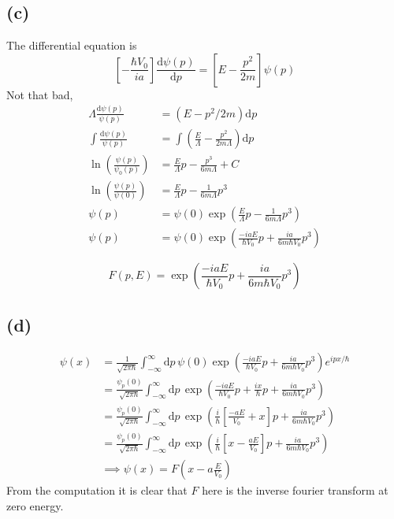 \documentclass[letterpaper]{article}
\newcommand{\hb}{\hbar}
\begin{document}
\subsection*{(c)} 
The differential equation is 
\[
\left[
- \frac{\hb V_0}{i a}
\right] \frac{\mathrm{d} \psi(p)}{\mathrm{d} p}  = 
\left[
E - \frac{p^2}{2m} \right] \psi(p)
\]
Not that bad, 
\begin{align*}
	\Lambda \frac{\mathrm{d} \psi(p)}{\psi(p)} &= (E - p^2 / 2m ) \mathrm{d} p \\
\int	\frac{\mathrm{d} \psi(p)}{\psi ( p) } &= 
\int	\left(\frac{E}{\Lambda} - \frac{p^2}{2m \Lambda}\right) \mathrm{d} p\\
\ln \left(\frac{\psi(p)}{\psi_0(p)}\right) &= \frac{E}{\Lambda} p - \frac{p^3}{6 m \Lambda} + C \\
\ln\left(\frac{\psi(p)}{\psi(0)}\right) &= 
\frac{E}{\Lambda}p - \frac{1}{6 m \Lambda} p^3
\\ 
\psi(p) &= \psi(0) \exp \left({
\frac{E}{\Lambda}p - \frac{1}{6 m \Lambda} p^3} \right) \\ 
\psi(p) &= \psi(0) \exp \left({
\frac{- i a E }{\hb V_0}p + \frac{i a }{6 m \hb V_0} p^3} \right)
\end{align*}

\[ \boxed{
F(p, E) =  \exp \left(
\frac{- i a E }{\hb V_0}p + \frac{i a }{6 m \hb V_0} p^3 \right)
}\] 


\subsection*{(d)} 
\begin{align*}
	\psi(x) &= \frac{1}{ \sqrt{ 2 \pi \hb}} 
	\int_{-\infty}^{\infty} \mathrm{d} p \, \psi(0)  
	\exp \left( 
\frac{- i a E }{\hb V_0}p + \frac{i a }{6 m \hb V_0} p^3 \right) e^{i p x / \hb } \\ 
&= 
\frac{\psi_p(0)}{\sqrt{2 \pi \hb } } 
\int_{-\infty}^{\infty} 
\mathrm{d} p \, 
\exp 
\left(
\frac{- i a E }{\hb V_0}p + \frac{i x}{\hb } p + \frac{i a }{6 m \hb V_0} p^3 
\right)
\\
&= 
\frac{\psi_p(0)}{\sqrt{2 \pi \hb } } 
\int_{-\infty}^{\infty} 
\mathrm{d} p \, 
\exp 
\left( \frac{i}{\hb} 
	\left [\frac{- a E }{ V_0} + { x}{ } \right ] p + \frac{i a }{6 m \hb V_0} p^3 
\right)
\\ & = 
\frac{\psi_p(0)}{\sqrt{2 \pi \hb } } 
\int_{-\infty}^{\infty} 
\mathrm{d} p \, 
\exp 
\left( \frac{i}{\hb} 
	\left [ x - \frac{ a E }{ V_0} \right ] p + \frac{i a }{6 m \hb V_0} p^3 
\right)
 \\&
\implies
\psi(x) = F \left(x - a \frac{E}{V_0}\right) 
\end{align*}
From the computation it is clear that $F$ here is the inverse 
 fourier transform at zero energy. 
\end{document}
